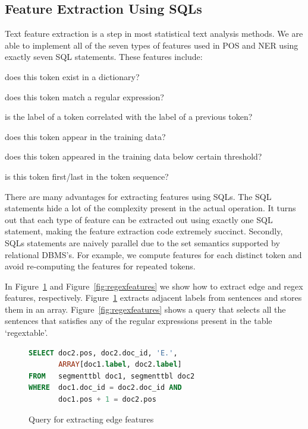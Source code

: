 \documentclass[11pt,letterpaper]{article}
\begin{document}
\subsection{Feature Extraction Using SQLs}
Text feature extraction is a step in most statistical text analysis methods.
We are able to implement all of the seven types of features used in POS and NER using exactly seven 
SQL statements. These features include: 
\begin{description}[noitemsep]
\item[Dictionary:] does this token exist in a dictionary? 
\item[Regex:] does this token match a regular expression? 
\item[Edge:] is the label of a token correlated with the label of a previous token? 
\item[Word:] does this token appear in the training data?
\item[Unknown:] does this token appeared in the training data below certain threshold? 
\item[Start/End:] is this token first/last in the token sequence?
\end{description}

There are many advantages for extracting features using SQLs.  
The SQL statements hide a lot of the complexity  present  in the actual operation.
It turns out that each type of feature can be extracted out using exactly one SQL statement, 
making the feature extraction code extremely succinct.  
Secondly, SQLs statements are naively parallel due to the set semantics supported by relational DBMS's.
For example, we compute features for each distinct token and avoid re-computing the features for repeated tokens.  

In Figure~\ref{fig:edgefeatures} and Figure~\ref{fig:regexfeatures} we show how to extract edge
and regex features, respectively.
Figure~\ref{fig:edgefeatures} extracts adjacent labels from sentences and stores them in an array.
Figure~\ref{fig:regexfeatures} shows a query that selects all the sentences that satisfies any 
of the regular expressions present in the table `regextable'.


\begin{figure}
\centering
\begin{lstlisting}[language=SQL,breaklines=true]
SELECT doc2.pos, doc2.doc_id, 'E.', 
       ARRAY[doc1.label, doc2.label]
FROM   segmenttbl doc1, segmenttbl doc2
WHERE  doc1.doc_id = doc2.doc_id AND 
       doc1.pos + 1 = doc2.pos
\end{lstlisting}
\caption{Query for extracting edge features}
\label{fig:edgefeatures}
\end{figure}
\end{document}
